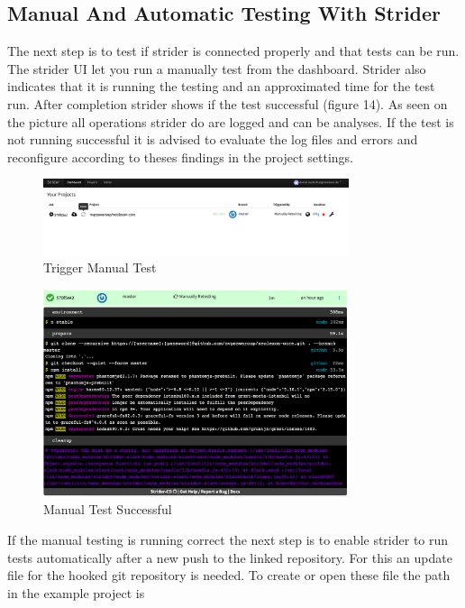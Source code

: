\subsection{Manual And Automatic Testing With Strider}
\label{Manual And Automatic Testing With Strider}
The next step is to test if strider is connected properly and that tests can be run. The strider UI let you run a manually test from
the dashboard. Strider also indicates that it is running the testing and an approximated time for the test run. After completion
strider shows if the test successful (figure 14). As seen on the picture all operations strider do are logged and can be
analyses. If the test is not running successful it is advised to evaluate the log files and errors and reconfigure according to theses
findings in the project settings.

\begin{figure}[h!]
  \centering
  \includegraphics[width=0.8\textwidth]{images/manualTest.png}
  \caption{Trigger Manual Test}
\end{figure}

\begin{figure}[h!]
  \centering
  \includegraphics[width=0.8\textwidth]{images/successfulManualTest.png}
  \caption{Manual Test Successful}
\end{figure}

If the manual testing is running correct the next step is to enable strider to run tests automatically after a new push to the
linked repository. For this an update file for the hooked git repository is needed. To create or open these file the path in
the example project is


